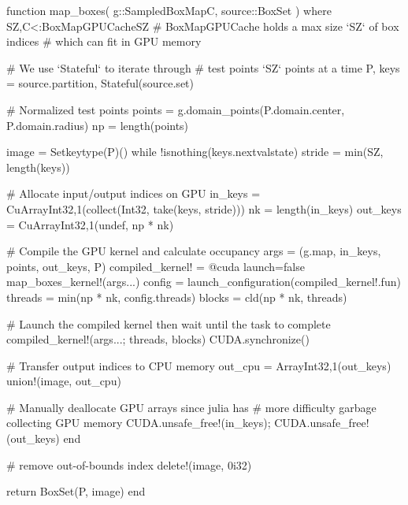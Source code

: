\begin{jllisting}[float, floatplacement=hb!, language=julia, style=jlcodestyle, label=lst:boxmap_gpu, caption=Function to calculate $f(\mathcal{B})$ with GPU acceleration]
    function map_boxes(
            g::SampledBoxMap{C}, source::BoxSet
        ) where {SZ,C<:BoxMapGPUCache{SZ}}
        # BoxMapGPUCache holds a max size `SZ` of box indices 
        # which can fit in GPU memory

        # We use `Stateful` to iterate through
        # test points `SZ` points at a time
        P, keys = source.partition, Stateful(source.set)

        # Normalized test points
        points = g.domain_points(P.domain.center, P.domain.radius)
        np = length(points)

        image = Set{keytype(P)}()
        while !isnothing(keys.nextvalstate)
            stride = min(SZ, length(keys))

            # Allocate input/output indices on GPU
            in_keys = CuArray{Int32,1}(collect(Int32, take(keys, stride)))
            nk = length(in_keys)
            out_keys = CuArray{Int32,1}(undef, np * nk)

            # Compile the GPU kernel and calculate occupancy
            args = (g.map, in_keys, points, out_keys, P)
            compiled_kernel! = @cuda launch=false map_boxes_kernel!(args...)
            config  = launch_configuration(compiled_kernel!.fun)
            threads = min(np * nk, config.threads)
            blocks  = cld(np * nk, threads)

            # Launch the compiled kernel then wait until the task to complete
            compiled_kernel!(args...; threads, blocks)
            CUDA.synchronize()
            
            # Transfer output indices to CPU memory
            out_cpu = Array{Int32,1}(out_keys)
            union!(image, out_cpu)

            # Manually deallocate GPU arrays since julia has 
            # more difficulty garbage collecting GPU memory
            CUDA.unsafe_free!(in_keys); CUDA.unsafe_free!(out_keys)
        end

        # remove out-of-bounds index
        delete!(image, 0i32)

        return BoxSet(P, image)
    end
\end{jllisting}

\clearpage

